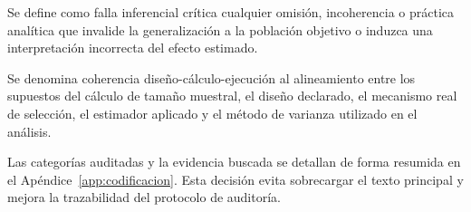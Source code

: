 \begin{definicion}
Se define como falla inferencial crítica cualquier omisión, incoherencia o práctica analítica que invalide la generalización a la población objetivo o induzca una interpretación incorrecta del efecto estimado.
\end{definicion}

\begin{definicion}
Se denomina coherencia diseño-cálculo-ejecución al alineamiento entre los supuestos del cálculo de tamaño muestral, el diseño declarado, el mecanismo real de selección, el estimador aplicado y el método de varianza utilizado en el análisis.
\end{definicion}

Las categorías auditadas y la evidencia buscada se detallan de forma resumida en el Apéndice~\ref{app:codificacion}. Esta decisión evita sobrecargar el texto principal y mejora la trazabilidad del protocolo de auditoría.
